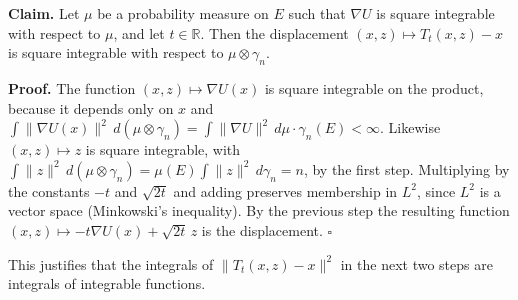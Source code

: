 \documentclass[11pt,a4paper]{report}
\begin{document}
\textbf{Claim.} Let \(\mu\) be a probability measure on \(E\) such that \(\nabla U\) is square integrable with respect to \(\mu\), and let \(t\in\mathbb R\). Then the displacement \((x,z)\mapsto T_t(x,z)-x\) is square integrable with respect to \(\mu\otimes\gamma_n\).




\textbf{Proof.} The function \((x,z)\mapsto\nabla U(x)\) is square integrable on the product, because it depends only on \(x\) and \(\int\|\nabla U(x)\|^2\,d(\mu\otimes\gamma_n)=\int\|\nabla U\|^2\,d\mu\cdot\gamma_n(E)<\infty\). Likewise \((x,z)\mapsto z\) is square integrable, with \(\int\|z\|^2\,d(\mu\otimes\gamma_n)=\mu(E)\int\|z\|^2\,d\gamma_n=n\), by the first step. Multiplying by the constants \(-t\) and \(\sqrt{2t}\) and adding preserves membership in \(L^2\), since \(L^2\) is a vector space (Minkowski's inequality). By the previous step the resulting function \((x,z)\mapsto-t\nabla U(x)+\sqrt{2t}\,z\) is the displacement. \(\square\)




This justifies that the integrals of \(\|T_t(x,z)-x\|^2\) in the next two steps are integrals of integrable functions.
\end{document}
